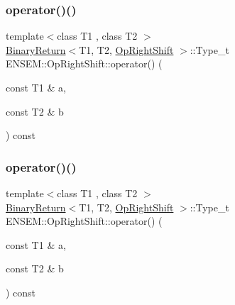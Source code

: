 \subsubsection{\texorpdfstring{operator()()}{operator()()}\hspace{0.1cm}{\footnotesize\ttfamily [1/3]}}
{\footnotesize\ttfamily template$<$class T1 , class T2 $>$ \\
\mbox{\hyperlink{structENSEM_1_1BinaryReturn}{Binary\+Return}}$<$T1, T2, \mbox{\hyperlink{structENSEM_1_1OpRightShift}{Op\+Right\+Shift}} $>$\+::Type\+\_\+t E\+N\+S\+E\+M\+::\+Op\+Right\+Shift\+::operator() (\begin{DoxyParamCaption}\item[{const T1 \&}]{a,  }\item[{const T2 \&}]{b }\end{DoxyParamCaption}) const\hspace{0.3cm}{\ttfamily [inline]}}

\mbox{\label{structENSEM_1_1OpRightShift_a8cfd6827272b2d7eda3b0912d67e4967}} 
\subsubsection{\texorpdfstring{operator()()}{operator()()}\hspace{0.1cm}{\footnotesize\ttfamily [2/3]}}
{\footnotesize\ttfamily template$<$class T1 , class T2 $>$ \\
\mbox{\hyperlink{structENSEM_1_1BinaryReturn}{Binary\+Return}}$<$T1, T2, \mbox{\hyperlink{structENSEM_1_1OpRightShift}{Op\+Right\+Shift}} $>$\+::Type\+\_\+t E\+N\+S\+E\+M\+::\+Op\+Right\+Shift\+::operator() (\begin{DoxyParamCaption}\item[{const T1 \&}]{a,  }\item[{const T2 \&}]{b }\end{DoxyParamCaption}) const\hspace{0.3cm}{\ttfamily [inline]}}

\mbox{\label{structENSEM_1_1OpRightShift_a8cfd6827272b2d7eda3b0912d67e4967}} 
